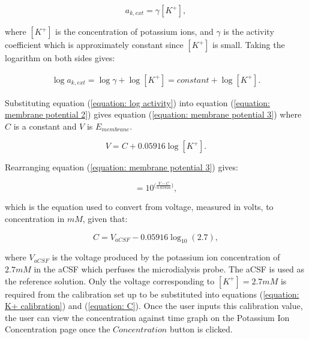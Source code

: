 \begin{equation}
    a_{k,ext} = \gamma [K^{+}],
    \label{equation: activity}
\end{equation}

\noindent where $[K^{+}]$ is the concentration of potassium ions, and $\gamma$ is the activity coefficient which is approximately constant since $[K^{+}]$ is small. Taking the logarithm on both sides gives:

\begin{align}
    \log a_{k,ext} = \log\gamma + \log [K^{+}] = constant + \log [K^{+}].
    \label{equation: log activity}
\end{align}

Substituting equation (\ref{equation: log activity}) into equation (\ref{equation: membrane potential 2}) gives equation (\ref{equation: membrane potential 3}) where $C$ is a constant and $V$ is $E_{membrane}$.

\begin{equation}
    V = C + 0.05916 \log [K^{+}].
    \label{equation: membrane potential 3}
\end{equation}

\noindent Rearranging equation (\ref{equation: membrane potential 3}) gives:

\begin{equation}
    [K^{+}] = 10^{\big(\frac{V-C}{0.05916}\big)},
    \label{equation: K+ calibration}
\end{equation}

\noindent which is the equation used to convert from voltage, measured in volts, to concentration in $mM$, given that:

\begin{equation}
    C = V_{aCSF} - 0.05916\log_{10} (2.7),
    \label{equation: C}
\end{equation}

\noindent where $V_{aCSF}$ is the voltage produced by the potassium ion concentration of $2.7mM$ in the aCSF which perfuses the microdialysis probe. The aCSF is used as the reference solution. Only the voltage corresponding to $[K^{+}] = 2.7mM$ is required from the calibration set up to be substituted into equations (\ref{equation: K+ calibration}) and (\ref{equation: C}). Once the user inputs this calibration value, the user can view the concentration against time graph on the Potassium Ion Concentration page once the $Concentration$ button is clicked. \newline




